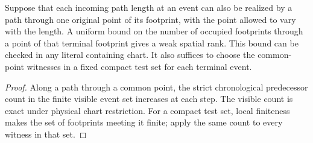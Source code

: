\begin{proposition}
\label{hir:g8-common-point-spatial-height}
\leanok
Suppose that each incoming path length at an event can also
be realized by a path through one original point of its
footprint, with the point allowed to vary with the length.
A uniform bound on the number of occupied footprints through
a point of that terminal footprint gives a weak spatial rank.
This bound can be checked in any literal containing chart.
It also suffices to choose the common-point witnesses in a
fixed compact test set for each terminal event.
\end{proposition}
\begin{proof}
Along a path through a common point, the strict chronological
predecessor count in the finite visible event set increases at
each step. The visible count is exact under physical chart
restriction. For a compact test set, local finiteness makes
the set of footprints meeting it finite; apply the same
count to every witness in that set.
\end{proof}

